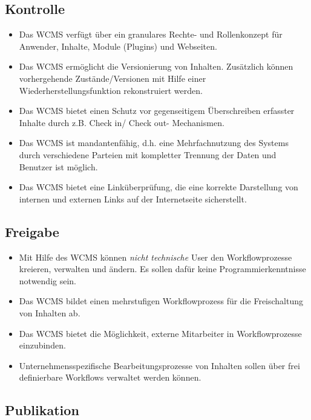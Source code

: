 
\subsection{Kontrolle}


\begin{itemize}
\item
Das WCMS verfügt über ein granulares Rechte- und Rollenkonzept für Anwender, Inhalte, Module (Plugins) und Webseiten.
\item
Das WCMS ermöglicht die Versionierung von Inhalten. Zusätzlich können vorhergehende Zustände/Versionen mit Hilfe einer Wiederherstellungsfunktion rekonstruiert werden.
\item
Das WCMS bietet einen Schutz vor gegenseitigem Überschreiben erfasster Inhalte durch z.B. Check in/ Check out- Mechanismen.
\item
Das WCMS ist mandantenfähig, d.h. eine Mehrfachnutzung des Systems durch verschiedene Parteien mit kompletter Trennung der Daten und Benutzer ist möglich.
\item
Das WCMS bietet eine Linküberprüfung, die eine korrekte Darstellung von internen und externen Links auf der Internetseite sicherstellt.
\end{itemize}


\subsection{Freigabe}

\begin{itemize}
\item
Mit Hilfe des WCMS können \emph{nicht technische} User den Workflowprozesse kreieren, verwalten und ändern. Es sollen dafür keine Programmierkenntnisse notwendig sein.
\item
Das WCMS bildet einen mehrstufigen Workflowprozess für die Freischaltung von Inhalten ab.
\item
Das WCMS bietet die Möglichkeit, externe Mitarbeiter in Workflowprozesse einzubinden.
\item
Unternehmensspezifische Bearbeitungsprozesse von Inhalten sollen über frei definierbare Workflows verwaltet werden können.
\end{itemize}



\subsection{Publikation}

